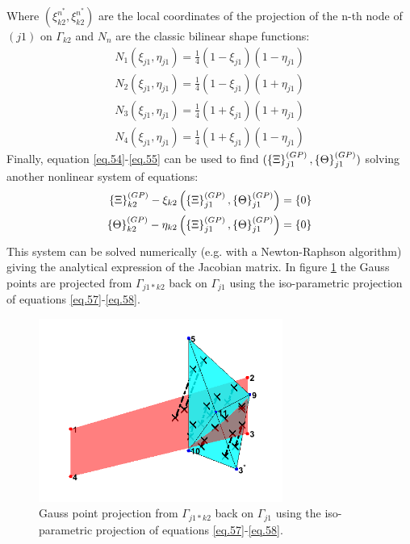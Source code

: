 Where $(\xi_{k2}^{n^*},\xi_{k2}^{n^*})$ are the local coordinates of the projection of the n-th node of $(j1)$ on $\Gamma_{k2}$ and $N_n$ are the classic bilinear shape functions:
\begin{equation}
\begin{array}{cc}
\label{eq.56}
N_1\left( \xi_{j1},\eta_{j1}\right)=\frac{1}{4}\left( 1-\xi_{j1}\right)\left( 1-\eta_{j1}\right) \\ N_2\left( \xi_{j1},\eta_{j1}\right)=\frac{1}{4}\left( 1-\xi_{j1}\right)\left( 1+\eta_{j1}\right) \\
N_3\left( \xi_{j1},\eta_{j1}\right)=\frac{1}{4}\left( 1+\xi_{j1}\right)\left( 1+\eta_{j1}\right) \\ N_4\left( \xi_{j1},\eta_{j1}\right)=\frac{1}{4}\left( 1+\xi_{j1}\right)\left( 1-\eta_{j1}\right)
\end{array}
\end{equation}
Finally, equation \eqref{eq.54}-\eqref{eq.55} can be used to find $(\left\lbrace{\Xi}\right \rbrace_{j1}^{(GP)},\left\lbrace{\Theta}\right \rbrace_{j1}^{(GP)})$ solving another nonlinear system of equations:
\begin{eqnarray}
\label{eq.57}
\left\lbrace{\Xi}\right \rbrace_{k2}^{(GP)}-\xi_{k2}\left( \left\lbrace{\Xi}\right \rbrace_{j1}^{(GP)},\left\lbrace{\Theta}\right \rbrace_{j1}^{(GP)}\right)=\left\lbrace{0}\right \rbrace \\
\label{eq.58}
\left\lbrace{\Theta}\right \rbrace_{k2}^{(GP)}-\eta_{k2}\left( \left\lbrace{\Xi}\right \rbrace_{j1}^{(GP)},\left\lbrace{\Theta}\right \rbrace_{j1}^{(GP)}\right)=\left\lbrace{0}\right \rbrace 
\end{eqnarray}
This system can be solved numerically (e.g. with a Newton-Raphson algorithm) giving the analytical expression of the Jacobian matrix. In figure \ref{fig.12} the Gauss points are projected from $\Gamma_{j1*k2}$ back on $\Gamma_{j1}$ using the iso-parametric projection of equations \eqref{eq.57}-\eqref{eq.58}.
\begin{figure}[ht]
\centering
\includegraphics[width=8cm]{images/Ch1/PGproj}
\caption{Gauss point projection from $\Gamma_{j1*k2}$ back on $\Gamma_{j1}$ using the iso-parametric projection of equations \eqref{eq.57}-\eqref{eq.58}.}  
\label{fig.12}
\end{figure}

